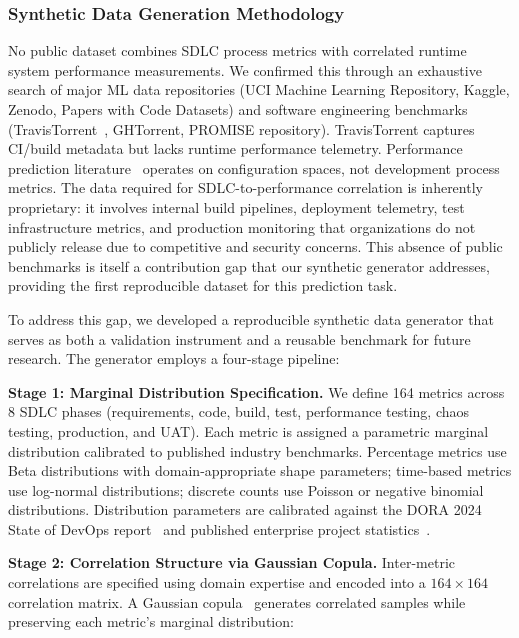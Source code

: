 \documentclass[technologies,article,submit,pdftex,moreauthors]{Definitions/mdpi}
\begin{document}
\subsubsection{Synthetic Data Generation
Methodology}\label{sec:synthetic_data}

No public dataset combines SDLC process metrics with correlated runtime
system performance measurements. We confirmed this through an exhaustive
search of major ML data repositories (UCI Machine Learning Repository,
Kaggle, Zenodo, Papers with Code Datasets) and software engineering
benchmarks (TravisTorrent~\cite{beller2017travistorrent}, GHTorrent,
PROMISE repository). TravisTorrent captures CI/build metadata but lacks
runtime performance telemetry. Performance prediction
literature~\cite{ha2019, siegmund2015} operates on configuration
spaces, not development process metrics. The data required for
SDLC-to-performance correlation is inherently proprietary: it involves
internal build pipelines, deployment telemetry, test infrastructure
metrics, and production monitoring that organizations do not publicly
release due to competitive and security concerns. This absence of public
benchmarks is itself a contribution gap that our synthetic generator
addresses, providing the first reproducible dataset for this prediction
task.

To address this gap, we developed a reproducible synthetic data
generator that serves as both a validation instrument and a reusable
benchmark for future research. The generator employs a four-stage
pipeline:

\textbf{Stage 1: Marginal Distribution Specification.} We define 164
metrics across 8 SDLC phases (requirements, code, build, test,
performance testing, chaos testing, production, and UAT). Each metric is
assigned a parametric marginal distribution calibrated to published
industry benchmarks. Percentage metrics use Beta distributions with
domain-appropriate shape parameters; time-based metrics use log-normal
distributions; discrete counts use Poisson or negative binomial
distributions. Distribution parameters are calibrated against the DORA
2024 State of DevOps report~\cite{dora2024} and published enterprise
project statistics~\cite{forsgren2018}.

\textbf{Stage 2: Correlation Structure via Gaussian Copula.}
Inter-metric correlations are specified using domain expertise and
encoded into a \(164 \times 164\) correlation matrix. A Gaussian
copula~\cite{nelsen2006} generates correlated samples while preserving
each metric's marginal distribution:
\end{document}
